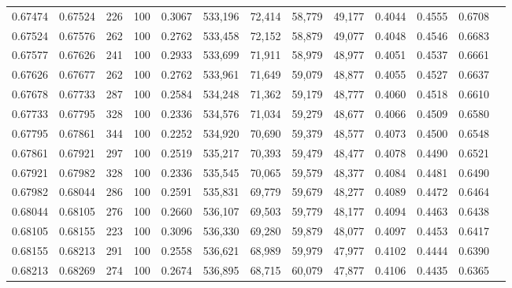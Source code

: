 \begin{tabular}{rrrrrrrrrrrrr}
0.67474 & 0.67524 &   226 & 100 &                                     0.3067 & 533,196 &  72,414 &  58,779 &  49,177 & 0.4044 & 0.4555 & 0.6708 \\
0.67524 & 0.67576 &   262 & 100 &                                     0.2762 & 533,458 &  72,152 &  58,879 &  49,077 & 0.4048 & 0.4546 & 0.6683 \\
0.67577 & 0.67626 &   241 & 100 &                                     0.2933 & 533,699 &  71,911 &  58,979 &  48,977 & 0.4051 & 0.4537 & 0.6661 \\
0.67626 & 0.67677 &   262 & 100 &                                     0.2762 & 533,961 &  71,649 &  59,079 &  48,877 & 0.4055 & 0.4527 & 0.6637 \\
0.67678 & 0.67733 &   287 & 100 &                                     0.2584 & 534,248 &  71,362 &  59,179 &  48,777 & 0.4060 & 0.4518 & 0.6610 \\
0.67733 & 0.67795 &   328 & 100 &                                     0.2336 & 534,576 &  71,034 &  59,279 &  48,677 & 0.4066 & 0.4509 & 0.6580 \\
0.67795 & 0.67861 &   344 & 100 &                                     0.2252 & 534,920 &  70,690 &  59,379 &  48,577 & 0.4073 & 0.4500 & 0.6548 \\
0.67861 & 0.67921 &   297 & 100 &                                     0.2519 & 535,217 &  70,393 &  59,479 &  48,477 & 0.4078 & 0.4490 & 0.6521 \\
0.67921 & 0.67982 &   328 & 100 &                                     0.2336 & 535,545 &  70,065 &  59,579 &  48,377 & 0.4084 & 0.4481 & 0.6490 \\
0.67982 & 0.68044 &   286 & 100 &                                     0.2591 & 535,831 &  69,779 &  59,679 &  48,277 & 0.4089 & 0.4472 & 0.6464 \\
0.68044 & 0.68105 &   276 & 100 &                                     0.2660 & 536,107 &  69,503 &  59,779 &  48,177 & 0.4094 & 0.4463 & 0.6438 \\
0.68105 & 0.68155 &   223 & 100 &                                     0.3096 & 536,330 &  69,280 &  59,879 &  48,077 & 0.4097 & 0.4453 & 0.6417 \\
0.68155 & 0.68213 &   291 & 100 &                                     0.2558 & 536,621 &  68,989 &  59,979 &  47,977 & 0.4102 & 0.4444 & 0.6390 \\
0.68213 & 0.68269 &   274 & 100 &                                     0.2674 & 536,895 &  68,715 &  60,079 &  47,877 & 0.4106 & 0.4435 & 0.6365 \\

\end{tabular}
